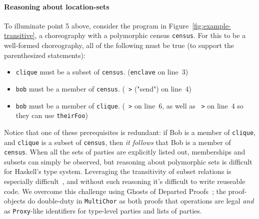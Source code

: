 \documentclass[sigplan,screen]{acmart}
\newcommand{\inlinecode}[2][haskell]{\texttt{#2}}
\newcommand{\MultiChor}{\texttt{Multi\-Chor}\xspace}
\begin{document}
\paragraph{Reasoning about location-sets}
To illuminate point 5 above, consider the program in Figure~\ref{fig:example-transitive},
a choreography with a polymorphic census \inlinecode{census}.
For this to be a well-formed choreography, all of the following must be true
(to support the parenthesized statements):
\begin{itemize}
    \item \inlinecode{clique} must be a subset of \inlinecode{census}.
          (\inlinecode{enclave} on line~3)
    \item \inlinecode{bob} must be a member of \inlinecode{census}.
          (\inlinecode{~>} ("send") on line~4)
    \item \inlinecode{bob} must be a member of \inlinecode{clique}.
          (\inlinecode{~>} on line~6, as well as \inlinecode{~>} on line~4 so they can use \inlinecode{theirFoo})
\end{itemize}
Notice that one of these prerequisites is redundant:
if Bob is a member of \inlinecode{clique}, and \inlinecode{clique} is a subset of \inlinecode{census},
then \emph{it follows} that Bob is a member of \inlinecode{census}.
When all the sets of parties are explicitly listed out, memberships and subsets can simply be observed,
but reasoning about polymorphic sets is difficult for Haskell's type system.
Leveraging the transitivity of subset relations is especially difficult~\cite{stackoverflow2021},
and without such reasoning it's difficult to write reuseable code.
We overcome this challenge using Ghosts of Departed Proofs~\cite{noonanGDP};
the proof-objects do double-duty in \MultiChor as both proofs that operations are legal \emph{and}
as \inlinecode{Proxy}-like identifiers for type-level parties and lists of parties.
\end{document}
